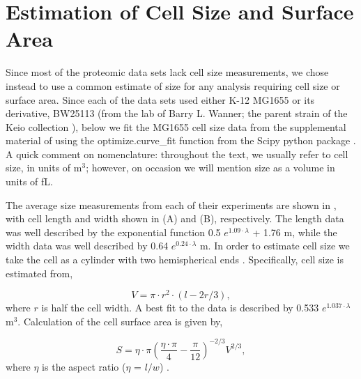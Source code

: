 \section{Estimation of Cell Size and Surface Area}
\label{sec:protein_size_SV} Since most of the proteomic data sets lack cell size
measurements, we chose instead to use a common estimate of size
for any analysis requiring cell size or surface area. Since each of the data
sets used either K-12 MG1655 or its derivative, BW25113 (from the lab of Barry
L. Wanner; the parent strain of the Keio collection \citep{datsenko2000,
baba2006}), below we fit the MG1655 cell size data from the supplemental material of
\cite{si2017, si2019} using the optimize.curve\_fit function from the Scipy
python package \citep{2020scipynmeth}. A quick comment on nomenclature: throughout
the text, we usually refer to cell size, in units of \textmu m$^3$; however,
on occasion we will mention size as a volume in units of fL.

The average size measurements from each of their experiments are shown in
, with  cell length and width shown in (A) and (B),
respectively. The length data was well described by the exponential function 0.5
$e^{1.09 \cdot \lambda}$ + 1.76 \textmu m, while the width data was well
described by 0.64 $e^{0.24 \cdot \lambda}$ \textmu m. In order to estimate cell
size we take the cell as a cylinder with two hemispherical ends \citep{si2017,
basan2015}. Specifically,  cell size  is estimated from,

\begin{equation}
V = \pi \cdot r^2 \cdot (l - 2r/3),
\label{eq:cell_size}
\end{equation}
where $r$ is half the cell width. A best fit to the data is described by 0.533
$e^{1.037 \cdot \lambda}$ \textmu m$^3$. Calculation of the cell surface area is
given by,

\begin{equation}
 S = \eta \cdot \pi (\frac{\eta \cdot \pi}{4} - \frac{\pi}{12})^{-2/3} V^{2/3},
 \label{eq:surface_area}
\end{equation}
where $\eta$ is the aspect ratio ($\eta$ = $l/w$) \citep{ojkic2019}.

